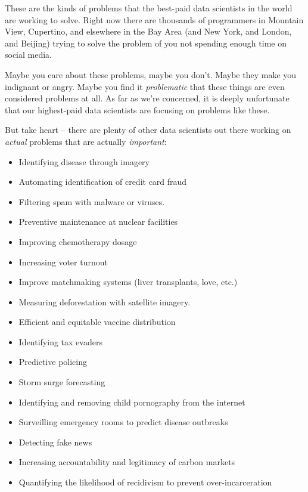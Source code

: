 \documentclass[
]{book}
\providecommand{\tightlist}{%
  \setlength{\itemsep}{0pt}\setlength{\parskip}{0pt}}
\begin{document}
These are the kinds of problems that the best-paid data scientists in the world are working to solve. Right now there are thousands of programmers in Mountain View, Cupertino, and elsewhere in the Bay Area (and New York, and London, and Beijing) trying to solve the problem of you not spending enough time on social media.

Maybe you care about these problems, maybe you don't. Maybe they make you indignant or angry. Maybe you find it \emph{problematic} that these things are even considered problems at all. As far as we're concerned, it is deeply unfortunate that our highest-paid data scientists are focusing on problems like these.

But take heart -- there are plenty of other data scientists out there working on \emph{actual} problems that are actually \emph{important}:

\begin{itemize}
\tightlist
\item
  Identifying disease through imagery\\
\item
  Automating identification of credit card fraud\\
\item
  Filtering spam with malware or viruses.\\
\item
  Preventive maintenance at nuclear facilities\\
\item
  Improving chemotherapy dosage\\
\item
  Increasing voter turnout\\
\item
  Improve matchmaking systems (liver transplants, love, etc.)\\
\item
  Measuring deforestation with satellite imagery.\\
\item
  Efficient and equitable vaccine distribution\\
\item
  Identifying tax evaders\\
\item
  Predictive policing\\
\item
  Storm surge forecasting\\
\item
  Identifying and removing child pornography from the internet\\
\item
  Surveilling emergency rooms to predict disease outbreaks\\
\item
  Detecting fake news\\
\item
  Increasing accountability and legitimacy of carbon markets\\
\item
  Quantifying the likelihood of recidivism to prevent over-incarceration
\end{itemize}
\end{document}
